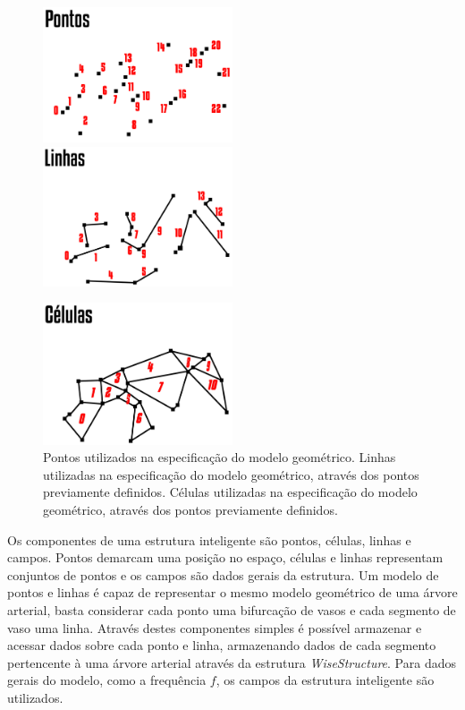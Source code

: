 \documentclass[a4paper,12pt]{monografia}
\theoremstyle{plain}
\theoremstyle{definition}
\theoremstyle{remark}
\begin{document}
\begin{figure}[!htbp]
	\includegraphics[width=0.5\textwidth]{Figures/WiseElementPoints@16x.png}
	\includegraphics[width=0.5\textwidth]{Figures/WiseElementLines@16x.png}
	
	\includegraphics[width=0.5\textwidth]{Figures/WiseElementCells@16x.png}
	\caption{Pontos utilizados na especificação do modelo geométrico. Linhas utilizadas na especificação do modelo geométrico, através dos pontos previamente definidos. Células utilizadas na especificação do modelo geométrico, através dos pontos previamente definidos.}
	\label{fig2:wiselementstructs}
\end{figure}

Os componentes de uma estrutura inteligente são pontos, células, linhas e campos. Pontos demarcam uma posição no espaço, células e linhas representam conjuntos de pontos e os campos são dados gerais da estrutura. Um modelo de pontos e linhas é capaz de representar o mesmo modelo geométrico de uma árvore arterial, basta considerar cada ponto uma bifurcação de vasos e cada segmento de vaso uma linha. Através destes componentes simples é possível armazenar e acessar dados sobre cada ponto e linha, armazenando dados de cada segmento pertencente à uma árvore arterial através da estrutura \textit{WiseStructure}. Para dados gerais do modelo, como a frequência $f$, os campos da estrutura inteligente são utilizados.
\end{document}

